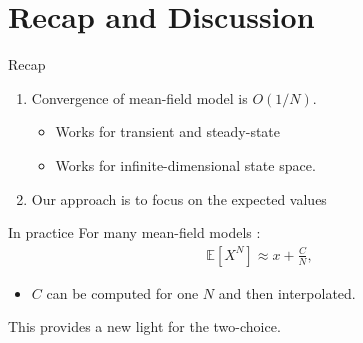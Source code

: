 \documentclass{beamer}
\newcommand\esp[1]{\mathbb{E}\left[#1\right]}
\begin{document}
\section{Recap and Discussion}

\begin{frame}{Recap}
  
  \begin{enumerate}
  \item Convergence of mean-field model is $O(1/N)$. 
    \begin{itemize}
    \item Works for transient and steady-state 
    \item Works for infinite-dimensional state space. 
    \end{itemize}\bigskip
    
  \item Our approach is to focus on the expected values
    \begin{center}
      \hspace{-1cm}
    \end{center}
  \end{enumerate}
\end{frame}

\begin{frame}{In practice}
  For many mean-field models : 
  \begin{align*}
    \esp{X^N} \approx x + \frac{C}{N},
  \end{align*}
  \begin{itemize}
  \item $C$ can be computed for one $N$ and then interpolated. 
  \end{itemize}
  \bigskip
  
  This provides a new light for the two-choice. 
\end{frame}
\end{document}
